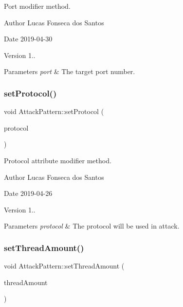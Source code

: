 Port modifier method. \begin{DoxyAuthor}{Author}
Lucas Fonseca dos Santos 
\end{DoxyAuthor}
\begin{DoxyDate}{Date}
2019-\/04-\/30 
\end{DoxyDate}
\begin{DoxyVersion}{Version}
1..
\end{DoxyVersion}

\begin{DoxyParams}{Parameters}
{\em port} & The target port number. \\
\hline
\end{DoxyParams}
\mbox{\label{classAttackPattern_a8e774193bb78ade48cade75d2ef1e7f2}} 
\subsubsection{\texorpdfstring{set\+Protocol()}{setProtocol()}}
{\footnotesize\ttfamily void Attack\+Pattern\+::set\+Protocol (\begin{DoxyParamCaption}\item[{Protocol\+Type\+::type}]{protocol }\end{DoxyParamCaption})}

Protocol attribute modifier method. \begin{DoxyAuthor}{Author}
Lucas Fonseca dos Santos 
\end{DoxyAuthor}
\begin{DoxyDate}{Date}
2019-\/04-\/26 
\end{DoxyDate}
\begin{DoxyVersion}{Version}
1..
\end{DoxyVersion}

\begin{DoxyParams}{Parameters}
{\em protocol} & The protocol will be used in attack. \\
\hline
\end{DoxyParams}
\mbox{\label{classAttackPattern_a94b44f6b6dbc0f7af85a400dfb973509}} 
\subsubsection{\texorpdfstring{set\+Thread\+Amount()}{setThreadAmount()}}
{\footnotesize\ttfamily void Attack\+Pattern\+::set\+Thread\+Amount (\begin{DoxyParamCaption}\item[{unsigned short}]{thread\+Amount }\end{DoxyParamCaption})}


